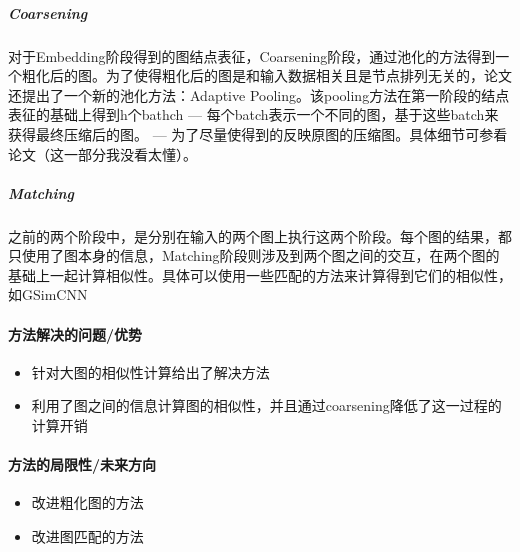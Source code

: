 \subparagraph{Coarsening}对于Embedding阶段得到的图结点表征，Coarsening阶段，通过池化的方法得到一个粗化后的图。为了使得粗化后的图是和输入数据相关且是节点排列无关的，论文还提出了一个新的池化方法：Adaptive Pooling。该pooling方法在第一阶段的结点表征的基础上得到h个bathch --- 每个batch表示一个不同的图，基于这些batch来获得最终压缩后的图。 --- 为了尽量使得到的反映原图的压缩图。具体细节可参看论文（这一部分我没看太懂）。

\subparagraph{Matching}之前的两个阶段中，是分别在输入的两个图上执行这两个阶段。每个图的结果，都只使用了图本身的信息，Matching阶段则涉及到两个图之间的交互，在两个图的基础上一起计算相似性。具体可以使用一些匹配的方法来计算得到它们的相似性，如GSimCNN


\paragraph{方法解决的问题/优势}
\begin{itemize}
	\item 针对大图的相似性计算给出了解决方法
	\item 利用了图之间的信息计算图的相似性，并且通过coarsening降低了这一过程的计算开销

\end{itemize}

\paragraph{方法的局限性/未来方向}
\begin{itemize}
	\item 改进粗化图的方法
	\item 改进图匹配的方法
\end{itemize}
